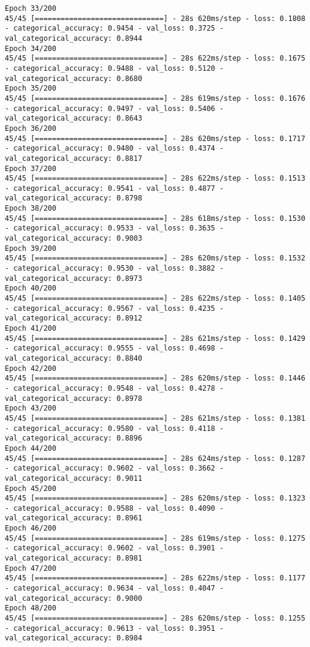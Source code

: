 \begin{lstlisting}
Epoch 33/200
45/45 [==============================] - 28s 620ms/step - loss: 0.1808 - categorical_accuracy: 0.9454 - val_loss: 0.3725 - val_categorical_accuracy: 0.8944
Epoch 34/200
45/45 [==============================] - 28s 622ms/step - loss: 0.1675 - categorical_accuracy: 0.9488 - val_loss: 0.5120 - val_categorical_accuracy: 0.8680
Epoch 35/200
45/45 [==============================] - 28s 619ms/step - loss: 0.1676 - categorical_accuracy: 0.9497 - val_loss: 0.5406 - val_categorical_accuracy: 0.8643
Epoch 36/200
45/45 [==============================] - 28s 620ms/step - loss: 0.1717 - categorical_accuracy: 0.9480 - val_loss: 0.4374 - val_categorical_accuracy: 0.8817
Epoch 37/200
45/45 [==============================] - 28s 622ms/step - loss: 0.1513 - categorical_accuracy: 0.9541 - val_loss: 0.4877 - val_categorical_accuracy: 0.8798
Epoch 38/200
45/45 [==============================] - 28s 618ms/step - loss: 0.1530 - categorical_accuracy: 0.9533 - val_loss: 0.3635 - val_categorical_accuracy: 0.9003
Epoch 39/200
45/45 [==============================] - 28s 620ms/step - loss: 0.1532 - categorical_accuracy: 0.9530 - val_loss: 0.3882 - val_categorical_accuracy: 0.8973
Epoch 40/200
45/45 [==============================] - 28s 622ms/step - loss: 0.1405 - categorical_accuracy: 0.9567 - val_loss: 0.4235 - val_categorical_accuracy: 0.8912
Epoch 41/200
45/45 [==============================] - 28s 621ms/step - loss: 0.1429 - categorical_accuracy: 0.9555 - val_loss: 0.4698 - val_categorical_accuracy: 0.8840
Epoch 42/200
45/45 [==============================] - 28s 620ms/step - loss: 0.1446 - categorical_accuracy: 0.9548 - val_loss: 0.4278 - val_categorical_accuracy: 0.8978
Epoch 43/200
45/45 [==============================] - 28s 621ms/step - loss: 0.1381 - categorical_accuracy: 0.9580 - val_loss: 0.4118 - val_categorical_accuracy: 0.8896
Epoch 44/200
45/45 [==============================] - 28s 624ms/step - loss: 0.1287 - categorical_accuracy: 0.9602 - val_loss: 0.3662 - val_categorical_accuracy: 0.9011
Epoch 45/200
45/45 [==============================] - 28s 620ms/step - loss: 0.1323 - categorical_accuracy: 0.9588 - val_loss: 0.4090 - val_categorical_accuracy: 0.8961
Epoch 46/200
45/45 [==============================] - 28s 619ms/step - loss: 0.1275 - categorical_accuracy: 0.9602 - val_loss: 0.3901 - val_categorical_accuracy: 0.8981
Epoch 47/200
45/45 [==============================] - 28s 622ms/step - loss: 0.1177 - categorical_accuracy: 0.9634 - val_loss: 0.4047 - val_categorical_accuracy: 0.9000
Epoch 48/200
45/45 [==============================] - 28s 620ms/step - loss: 0.1255 - categorical_accuracy: 0.9613 - val_loss: 0.3951 - val_categorical_accuracy: 0.8984

\end{lstlisting}

